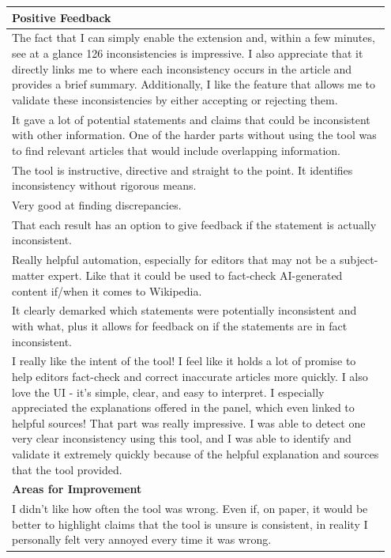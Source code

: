 \begin{table}[htbp]
\centering
\begin{tabular}{p{0.95\linewidth}}
\toprule
\textbf{Positive Feedback} \\
\midrule
The fact that I can simply enable the extension and, within a few minutes, see at a glance 126 inconsistencies is impressive. I also appreciate that it directly links me to where each inconsistency occurs in the article and provides a brief summary. Additionally, I like the feature that allows me to validate these inconsistencies by either accepting or rejecting them. \\
\midrule
It gave a lot of potential statements and claims that could be inconsistent with other information. One of the harder parts without using the tool was to find relevant articles that would include overlapping information. \\
\midrule
The tool is instructive, directive and straight to the point. It identifies inconsistency without rigorous means. \\
\midrule
Very good at finding discrepancies. \\
\midrule
That each result has an option to give feedback if the statement is actually inconsistent. \\
\midrule
Really helpful automation, especially for editors that may not be a subject-matter expert. Like that it could be used to fact-check AI-generated content if/when it comes to Wikipedia. \\
\midrule
It clearly demarked which statements were potentially inconsistent and with what, plus it allows for feedback on if the statements are in fact inconsistent. \\
\midrule
I really like the intent of the tool! I feel like it holds a lot of promise to help editors fact-check and correct inaccurate articles more quickly. I also love the UI - it's simple, clear, and easy to interpret. I especially appreciated the explanations offered in the panel, which even linked to helpful sources! That part was really impressive. I was able to detect one very clear inconsistency using this tool, and I was able to identify and validate it extremely quickly because of the helpful explanation and sources that the tool provided. \\
\midrule
\textbf{Areas for Improvement} \\
\midrule
I didn't like how often the tool was wrong. Even if, on paper, it would be better to highlight claims that the tool is unsure is consistent, in reality I personally felt very annoyed every time it was wrong. \\

\end{tabular}
\end{table}
